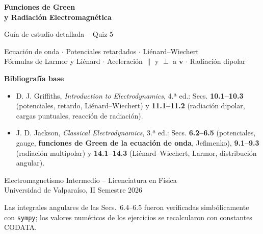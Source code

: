 \documentclass[11pt,a4paper]{article}
\newcounter{ejer}
\theoremstyle{remark}
\begin{document}
\begin{titlepage}
\thispagestyle{empty}
\centering
\vspace*{3.2cm}
{\Huge\bfseries Funciones de Green\\[0.25em] y Radiación Electromagnética\par}
\vspace{1.2em}
{\Large Guía de estudio detallada -- Quiz 5\par}
\vspace{1.5em}
{\large Ecuación de onda $\cdot$ Potenciales retardados $\cdot$ Liénard--Wiechert\\
Fórmulas de Larmor y Liénard $\cdot$ Aceleración $\parallel$ y $\perp$ a $\mathbf v$ $\cdot$ Radiación dipolar\par}
\vspace{2.5em}
\begin{minipage}{0.82\textwidth}
\begin{refbox}
\textbf{Bibliografía base}
\begin{itemize}[leftmargin=1.2em,itemsep=0.3em]
\item D. J. Griffiths, \textit{Introduction to Electrodynamics}, 4.ª ed.: Secs. \textbf{10.1--10.3}
(potenciales, retardo, Liénard--Wiechert) y \textbf{11.1--11.2} (radiación dipolar, cargas puntuales,
reacción de radiación).
\item J. D. Jackson, \textit{Classical Electrodynamics}, 3.ª ed.: Secs. \textbf{6.2--6.5}
(potenciales, gauge, \textbf{funciones de Green de la ecuación de onda}, Jefimenko), \textbf{9.1--9.3}
(radiación multipolar) y \textbf{14.1--14.3} (Liénard--Wiechert, Larmor, distribución angular).
\end{itemize}
\end{refbox}
\end{minipage}
\vspace{2em}

{\large Electromagnetismo Intermedio -- Licenciatura en Física\\ Universidad de Valparaíso, II Semestre 2026\par}
\vfill
{\small Las integrales angulares de las Secs.~6.4--6.5 fueron verificadas simbólicamente con \texttt{sympy};
los valores numéricos de los ejercicios se recalcularon con constantes CODATA.\par}
\end{titlepage}

\tableofcontents
\newpage

\end{document}
